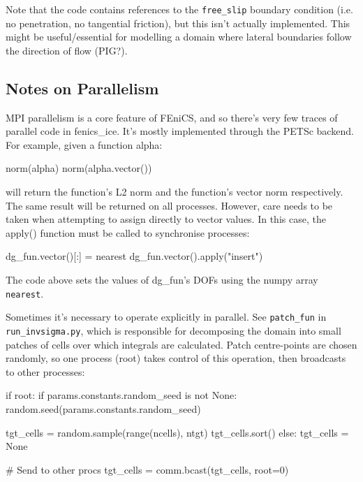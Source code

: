 \documentclass[11pt, reqno, nocenter]{article}
\begin{document}
Note that the code contains references to the {\tt free\_slip} boundary condition (i.e. no penetration, no tangential friction), but this isn't actually implemented. This might be useful/essential for modelling a domain where lateral boundaries follow the direction of flow (PIG?).

\subsection{Notes on Parallelism} \label{sec:parallel}

MPI parallelism is a core feature of FEniCS, and so there's very few traces of parallel code in fenics\_ice. It's mostly implemented through the PETSc backend. For example, given a function alpha:

\begin{spverbatim}
  norm(alpha)
  norm(alpha.vector())
\end{spverbatim}

will return the function's L2 norm and the function's vector norm respectively. The same result will be returned on all processes. However, care needs to be taken when attempting to assign directly to vector values. In this case, the apply() function must be called to synchronise processes:

\begin{spverbatim}
    dg_fun.vector()[:] = nearest
    dg_fun.vector().apply("insert")
\end{spverbatim}

The code above sets the values of dg\_fun's DOFs using the numpy array {\tt nearest}.

Sometimes it's necessary to operate explicitly in parallel. See {\tt patch\_fun} in {\tt run\_invsigma.py}, which is responsible for decomposing the domain into small patches of cells over which integrals are calculated. Patch centre-points are chosen randomly, so one process (root) takes control of this operation, then broadcasts to other processes:

\begin{spverbatim}
    if root:
        if params.constants.random_seed is not None:
            random.seed(params.constants.random_seed)

        tgt_cells = random.sample(range(ncells), ntgt)
        tgt_cells.sort()
    else:
        tgt_cells = None

    # Send to other procs
    tgt_cells = comm.bcast(tgt_cells, root=0)
\end{spverbatim}
\end{document}
